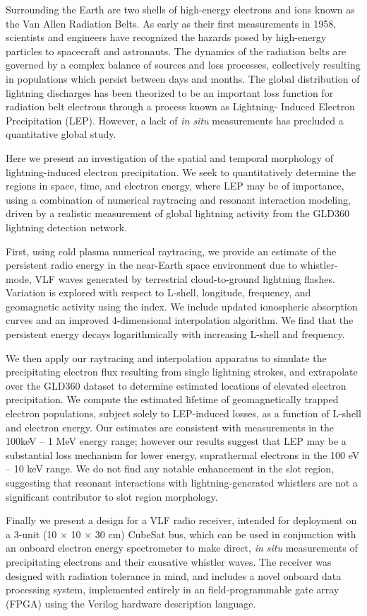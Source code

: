 Surrounding the Earth are two shells of high-energy electrons and ions known as the Van Allen Radiation Belts. As early as their first measurements in 1958, scientists and engineers have recognized the hazards posed by high-energy particles to spacecraft and astronauts. The dynamics of the radiation belts are governed by a complex balance of sources and loss processes, collectively resulting in populations which persist between days and months. The global distribution of lightning discharges has been theorized to be an important loss function for radiation belt electrons through a process known as Lightning- Induced Electron Precipitation (LEP). However, a lack of \emph{in situ} measurements has precluded a quantitative global study. 

Here we present an investigation of the spatial and temporal morphology of lightning-induced electron precipitation. We seek to quantitatively determine the regions in space, time, and electron energy, where LEP may be of importance, using a combination of numerical raytracing and resonant interaction modeling, driven by a realistic measurement of global lightning activity from the GLD360 lightning detection network.

First, using cold plasma numerical raytracing, we provide an estimate of the persistent radio energy in the near-Earth space environment due to whistler-mode, VLF waves generated by terrestrial cloud-to-ground lightning flashes. Variation is explored with respect to L-shell, longitude, frequency, and geomagnetic activity using the \kp{} index. We include updated ionospheric absorption curves and an improved 4-dimensional interpolation algorithm. We find that the persistent energy decays logarithmically with increasing L-shell and frequency.

We then apply our raytracing and interpolation apparatus to simulate the precipitating electron flux resulting from single lightning strokes, and extrapolate over the GLD360 dataset to determine estimated locations of elevated electron precipitation. We compute the estimated lifetime of geomagnetically trapped electron populations, subject solely to LEP-induced losses, as a function of L-shell and electron energy. Our estimates are consistent with measurements in the 100keV -- 1 MeV energy range; however our results suggest that LEP may be a substantial loss mechanism for lower energy, suprathermal electrons in the 100 eV -- 10 keV range. We do not find any notable enhancement in the slot region, suggesting that resonant interactions with lightning-generated whistlers are not a significant contributor to slot region morphology.

Finally we present a design for a VLF radio receiver, intended for deployment on a 3-unit (10 $\times$ 10 $\times$ 30 cm) CubeSat bus, which can be used in conjunction with an onboard electron energy spectrometer to make direct, \emph{in situ} measurements of precipitating electrons and their causative whistler waves. The receiver was designed with radiation tolerance in mind, and includes a novel onboard data processing system, implemented entirely in an field-programmable gate array (FPGA) using the Verilog hardware description language.
